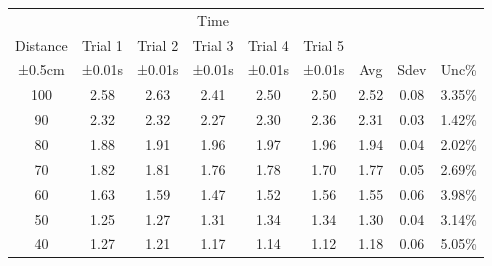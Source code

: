 \documentclass[12pt]{report}
\begin{document}
 \begin{table}[]
    \begin{tabular}{ccccccccc}
        \cellcolor[HTML]{6D9EEB}                           & \multicolumn{5}{c}{\cellcolor[HTML]{93C47D}Time} &         &         &                                                                                              \\
        \multirow{-2}{*}{\cellcolor[HTML]{6D9EEB}Distance} & Trial 1                                          & Trial 2 & Trial 3 & Trial 4 & Trial 5 &                       &                        &                         \\
        ±0.5cm                                             & ±0.01s                                           & ±0.01s  & ±0.01s  & ±0.01s  & ±0.01s  & \multirow{-3}{*}{Avg} & \multirow{-3}{*}{Sdev} & \multirow{-3}{*}{Unc\%} \\
        100                                                & 2.58                                             & 2.63    & 2.41    & 2.50    & 2.50    & 2.52                  & 0.08                   & 3.35\%                  \\
        90                                                 & 2.32                                             & 2.32    & 2.27    & 2.30    & 2.36    & 2.31                  & 0.03                   & 1.42\%                  \\
        80                                                 & 1.88                                             & 1.91    & 1.96    & 1.97    & 1.96    & 1.94                  & 0.04                   & 2.02\%                  \\
        70                                                 & 1.82                                             & 1.81    & 1.76    & 1.78    & 1.70    & 1.77                  & 0.05                   & 2.69\%                  \\
        60                                                 & 1.63                                             & 1.59    & 1.47    & 1.52    & 1.56    & 1.55                  & 0.06                   & 3.98\%                  \\
        50                                                 & 1.25                                             & 1.27    & 1.31    & 1.34    & 1.34    & 1.30                  & 0.04                   & 3.14\%                  \\
        40                                                 & 1.27                                             & 1.21    & 1.17    & 1.14    & 1.12    & 1.18                  & 0.06                   & 5.05\%                  \\

\end{tabular}
\end{table}
\end{document}
